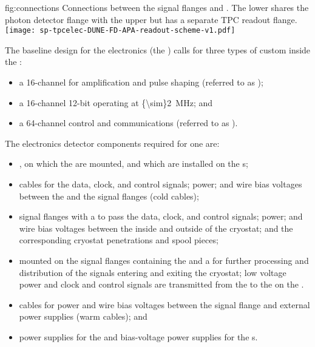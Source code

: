 
\begin{dunefigure}
{fig:connections}
{Connections between the signal flanges and . The lower 
 shares the photon detector flange with the 
upper  but has a separate TPC readout flange.}
\texttt{[image: sp-tpcelec-DUNE-FD-APA-readout-scheme-v1.pdf]}
\end{dunefigure}

The baseline design for the   electronics (the ) calls for three 
types of custom  inside  the :
\begin{itemize}
\item{a \num{16}-channel   for amplification 
and pulse shaping (referred to as );}
\item{a \num{16}-channel \num{12}-bit   
operating at \SI{{\sim}2}{MHz}; and}
\item{a \num{64}-channel control and communications  
(referred to as ).}
\end{itemize}

The  electronics detector components required for one  are: 
\begin{itemize}
\item{, on which the  are mounted, and 
which are installed on the s;}
\item{cables for the data, clock, and control signals;  
power; and wire bias voltages between the  and the 
signal flanges (cold cables);}
\item{signal flanges with a  \fdth to pass the data, clock, 
and control signals;  power; and  wire bias 
voltages between the inside and outside of the cryostat; and 
the corresponding cryostat penetrations and spool pieces;}
\item{ mounted on the signal flanges 
containing the  and a  for further processing
and distribution of the signals entering and exiting the cryostat;
low voltage power and clock and control signals are transmitted
from the  to the  on 
the .}
\item{cables for  power and wire bias voltages between 
the signal flange and external power supplies (warm cables); and}
\item{ power supplies for the  and bias-voltage 
power supplies for the s.}
\end{itemize}

